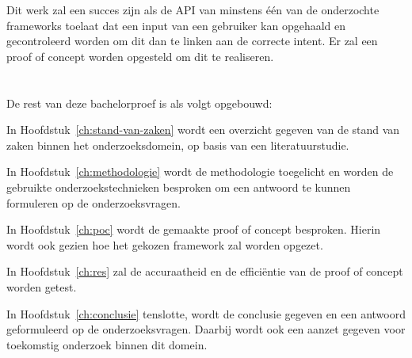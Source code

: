 Dit werk zal een succes zijn als de API van minstens één van de onderzochte frameworks toelaat dat een input van een gebruiker kan opgehaald en gecontroleerd worden om dit dan te linken aan de correcte intent. Er zal een proof of concept worden opgesteld om dit te realiseren.

\section{}
\label{sec:opzet-bachelorproef}


De rest van deze bachelorproef is als volgt opgebouwd:

In Hoofdstuk~\ref{ch:stand-van-zaken} wordt een overzicht gegeven van de stand van zaken binnen het onderzoeksdomein, op basis van een literatuurstudie.

In Hoofdstuk~\ref{ch:methodologie} wordt de methodologie toegelicht en worden de gebruikte onderzoekstechnieken besproken om een antwoord te kunnen formuleren op de onderzoeksvragen.


In Hoofdstuk~\ref{ch:poc} wordt de gemaakte proof of concept besproken. Hierin wordt ook gezien hoe het gekozen framework zal worden opgezet.

In Hoofdstuk~\ref{ch:res} zal de accuraatheid en de efficiëntie van de proof of concept worden getest.

In Hoofdstuk~\ref{ch:conclusie} tenslotte, wordt de conclusie gegeven en een antwoord geformuleerd op de onderzoeksvragen. Daarbij wordt ook een aanzet gegeven voor toekomstig onderzoek binnen dit domein.